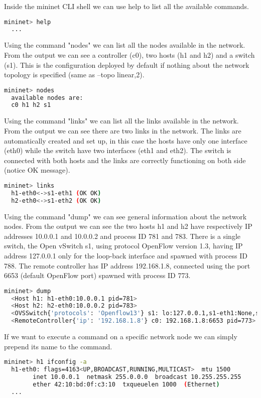 \documentclass[a4paper,10pt]{memoir}
\begin{document}
Inside the mininet CLI shell we can use help to list all the available commands.
\begin{lstlisting}[language=bash]
  mininet> help
  ...
\end{lstlisting}

Using the command "nodes" we can list all the nodes available in the network. From the output we can see a controller (c0), two hosts (h1 and h2) and a switch (s1). This is the configuration deployed by default if nothing about the network topology is specified (same as --topo linear,2).
\begin{lstlisting}[language=bash]
  mininet> nodes
  available nodes are:
  c0 h1 h2 s1
\end{lstlisting}

Using the command "links" we can list all the links available in the network. From the output we can see there are two links in the network. The links are automatically created and set up, in this case the hosts have only one interface (eth0) while the switch have two interfaces (eth1 and eth2). The switch is connected with both hosts and the links are correctly functioning on both side (notice OK message).
\begin{lstlisting}[language=bash]
  mininet> links
  h1-eth0<->s1-eth1 (OK OK)
  h2-eth0<->s1-eth2 (OK OK)
\end{lstlisting}

Using the command "dump" we can see general information about the network nodes. From the output we can see the two hosts h1 and h2 have respectively IP addresses 10.0.0.1 and 10.0.0.2 and process ID 781 and 783. There is a single switch, the Open vSwitch s1, using protocol OpenFlow version 1.3, having IP address 127.0.0.1 only for the loop-back interface and spawned with process ID 788. The remote controller has IP address 192.168.1.8, connected using the port 6653 (default OpenFlow port) spawned with process ID 773.
\begin{lstlisting}[language=bash]
  mininet> dump
  <Host h1: h1-eth0:10.0.0.1 pid=781>
  <Host h2: h2-eth0:10.0.0.2 pid=783>
  <OVSSwitch{'protocols': 'Openflow13'} s1: lo:127.0.0.1,s1-eth1:None,s1-eth2:None pid=788>
  <RemoteController{'ip': '192.168.1.8'} c0: 192.168.1.8:6653 pid=773>
\end{lstlisting}

If we want to execute a command on a specific network node we can simply prepend its name to the command.
\begin{lstlisting}[language=bash]
  mininet> h1 ifconfig -a
  h1-eth0: flags=4163<UP,BROADCAST,RUNNING,MULTICAST>  mtu 1500
        inet 10.0.0.1  netmask 255.0.0.0  broadcast 10.255.255.255
        ether 42:10:bd:0f:c3:10  txqueuelen 1000  (Ethernet)
  ...
\end{lstlisting}
\end{document}

